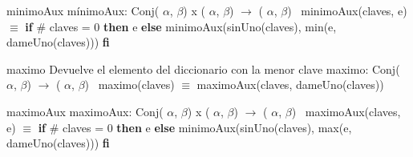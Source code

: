 \begin{DoxyParagraph}{minimo\+Aux}
mínimo\+Aux\+: Conj( $\alpha$, $\beta$) x ( $\alpha$, $\beta$) $\to$ ( $\alpha$, $\beta$)~\newline
 minimo\+Aux(claves, e) $\equiv$ {\bfseries if} \# claves = 0 {\bfseries then} e {\bfseries else} minimo\+Aux(sin\+Uno(claves), min(e, dame\+Uno(claves))) {\bfseries fi} 
\end{DoxyParagraph}


\begin{DoxyParagraph}{maximo}
Devuelve el elemento del diccionario con la menor clave maximo\+: Conj( $\alpha$, $\beta$) $\to$ ( $\alpha$, $\beta$)~\newline
 maximo(claves) $\equiv$ maximo\+Aux(claves, dame\+Uno(claves)) 
\end{DoxyParagraph}


\begin{DoxyParagraph}{maximo\+Aux}
maximo\+Aux\+: Conj( $\alpha$, $\beta$) x ( $\alpha$, $\beta$) $\to$ ( $\alpha$, $\beta$)~\newline
 maximo\+Aux(claves, e) $\equiv$ {\bfseries if} \# claves = 0 {\bfseries then} e {\bfseries else} minimo\+Aux(sin\+Uno(claves), max(e, dame\+Uno(claves))) {\bfseries fi} 
\end{DoxyParagraph}

